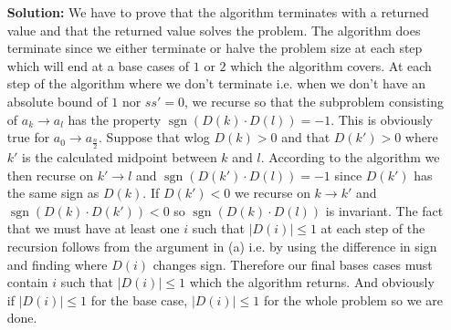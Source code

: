 \documentclass[12pt,twoside]{article}
\newcommand{\sgn}{\operatorname{sgn}}
\begin{document}
\begin{problems}
\begin{problemparts}
\begin{itemize}
\end{itemize}
\problempart
\begin{itemize}
\item [\textbf{Solution:}] We have to prove that the algorithm terminates with a returned value and that the returned value solves the problem. The algorithm does terminate since we either terminate or halve the problem size at each step which will end at a base cases of $1$ or $2$ which the algorithm covers. At each step of the algorithm where we don't terminate i.e. when we don't have an absolute bound of $1$ nor $ss'=0$, we recurse so that the subproblem consisting of $a_k \rightarrow a_l$ has the property $\sgn(D(k)\cdot D(l))=-1$. This is obviously true for $a_0\rightarrow a_{\frac{n}{2}}$. Suppose that wlog $D(k)>0$ and that $D(k') > 0$ where $k'$ is the calculated midpoint between $k$ and $l$. According to the algorithm we then recurse on $k'\rightarrow l$ and $\sgn(D(k')\cdot D(l))=-1$ since $D(k')$ has the same sign as $D(k)$. If $D(k')<0$ we recurse on $k\rightarrow k'$ and $\sgn(D(k)\cdot D(k'))<0$ so $\sgn(D(k)\cdot D(l))$ is invariant. The fact that we must have at least one $i$ such that $|D(i)|\leq 1$ at each step of the recursion follows from the argument in (a) i.e. by using the difference in sign and finding where $D(i)$ changes sign. Therefore our final bases cases must contain $i$ such that $|D(i)|\leq 1$ which the algorithm returns. And obviously if $|D(i)|\leq 1$ for the base case, $|D(i)|\leq 1$ for the whole problem so we are done.
\end{itemize}
\end{problemparts}

\end{problems}
\end{document}
